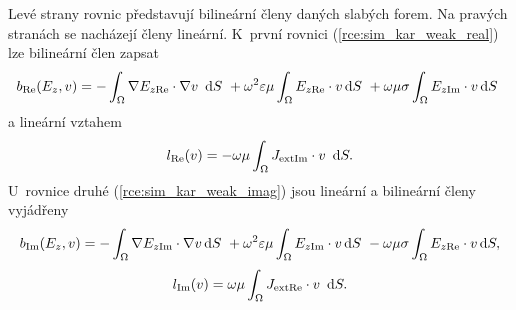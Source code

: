 Levé strany rovnic představují bilineární členy daných slabých forem. Na pravých stranách se nacházejí členy lineární. K~první rovnici (\ref{rce:sim_kar_weak_real}) lze bilineární člen zapsat
\begin{equation}
	b_{\mathrm{Re}}(E_{z},v) = -\int_{\Omega}\nabla E_{z\mathrm{Re}}\cdot\nabla v~\,\mathrm{d} S~+ \omega^{2}\varepsilon\mu\int_{\Omega} E_{z\mathrm{Re}}\cdot v\,\mathrm{d} S~+ \omega\mu\sigma\int_{\Omega} E_{z\mathrm{Im}}\cdot v\,\mathrm{d}
S~\label{rce:sim_kar_bilinear_real} 
\end{equation}
a lineární vztahem
\begin{equation}
	l_{\mathrm{Re}}(v) = - \omega\mu \int_{\Omega}J_{\mathrm{ext}\mathrm{Im}}\cdot v~\,\mathrm{d} S.
	\label{rce:sim_kar_linear_real}
\end{equation}
U~rovnice druhé (\ref{rce:sim_kar_weak_imag}) jsou lineární a bilineární členy vyjádřeny
\begin{equation}
	b_{\mathrm{Im}}(E_{z},v) = -\int_{\Omega}\nabla E_{z\mathrm{Im}}\cdot\nabla v\,\mathrm{d} S~+ \omega^{2}\varepsilon\mu\int_{\Omega} E_{z\mathrm{Im}}\cdot v\,\mathrm{d} S~- \omega\mu\sigma\int_{\Omega} E_{z\mathrm{Re}}\cdot v\,\mathrm{d} S,
	\label{rce:sim_kar_bilinear_imag}	
\end{equation}
\begin{equation}
	l_{\mathrm{Im}}(v) = \omega\mu \int_{\Omega}J_{\mathrm{ext}\mathrm{Re}}\cdot v~\,\mathrm{d} S.
	\label{rce:sim_kar_linear_imag}
\end{equation}

